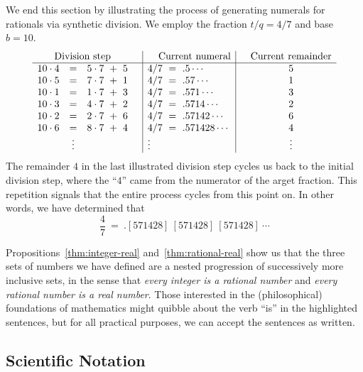 \bigskip

We end this section by illustrating the process of generating numerals
for rationals via synthetic division.  We employ the fraction $t/q = 4/7$
and base $b = 10$.
\[
\begin{array}{lclc|l|cc}
\multicolumn{3}{c}{\mbox{Division step}} & &  \hspace*{.15in} \mbox{Current numeral} & &
\mbox{Current remainder} \\
\hline
10 \cdot 4   & = & 5 \cdot 7 \ + \ 5 &
      & 4/7 \ = \ .5 \cdots &
      & 5 \\
10 \cdot 5 & = & 7 \cdot 7 \ + \ 1 &
      & 4/7 \ = \ .57 \cdots &
      & 1 \\
10 \cdot 1 & = & 1 \cdot 7 \ + \ 3 &
      & 4/7 \ = \ .571 \cdots &
      & 3 \\
10 \cdot 3 & = & 4 \cdot 7 \ + \ 2 &
      & 4/7 \ = \ .5714 \cdots &
      & 2 \\
10 \cdot 2 & = & 2 \cdot 7 \ + \ 6 &
      & 4/7 \ = \ .57142 \cdots &
      & 6 \\
10 \cdot 6 & = & 8 \cdot 7 \ + \ 4 &
      & 4/7 \ = \ .571428 \cdots &
      & 4 \\
 & \vdots & & & \vdots & & \vdots
\end{array}
\]
The remainder $4$ in the last illustrated division step cycles us back
to the initial division step, where the ``$4$'' came from the
numerator of the arget fraction.  This repetition signals that the
entire process cycles from this point on.  In other words, we have
determined that
\[ \frac{4}{7} \ = \ .[571428] \ [571428] \ [571428] \ \cdots \]

\bigskip

Propositions~\ref{thm:integer-real} and~\ref{thm:rational-real} show
us that the three sets of numbers we have defined are a nested
progression of successively more inclusive sets, in the sense that
{\em every integer is a rational number} and {\em every rational
  number is a real number}.  Those interested in the (philosophical)
foundations of mathematics might quibble about the verb ``is'' in the
highlighted sentences, but for all practical purposes, we can accept
the sentences as written.



\subsection{Scientific Notation}
\label{sec:scientific-notation}

